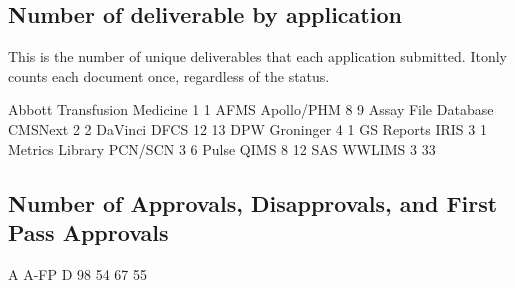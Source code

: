 \documentclass{article}
\begin{document}
\subsection{Number of deliverable by application}
This is the number of unique deliverables that each application submitted. Itonly counts
each document once, regardless of the status.
\begin{Schunk}
\begin{Soutput}
                            Abbott Transfusion Medicine 
                          1                           1 
                       AFMS                  Apollo/PHM 
                          8                           9 
        Assay File Database                     CMSNext 
                          2                           2 
                    DaVinci                        DFCS 
                         12                          13 
                        DPW                   Groninger 
                          4                           1 
                 GS Reports                        IRIS 
                          3                           1 
            Metrics Library                     PCN/SCN 
                          3                           6 
                      Pulse                        QIMS 
                          8                          12 
                        SAS                      WWLIMS 
                          3                          33 
\end{Soutput}
\end{Schunk}

\subsection{Number of Approvals, Disapprovals, and First Pass Approvals}

\begin{Schunk}
\begin{Soutput}
        A A-FP    D 
  98   54   67   55 
\end{Soutput}
\end{Schunk}
\end{document}

